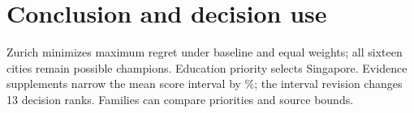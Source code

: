 \section{Conclusion and decision use}
Zurich minimizes maximum regret under baseline and equal weights; all sixteen
cities remain possible champions. Education priority selects Singapore. Evidence
supplements narrow the mean score interval by \TotalWidthReduction\%; the interval
revision changes 13 decision ranks. Families can compare priorities and source bounds.

